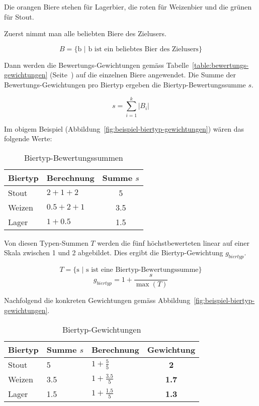 \documentclass[10pt,a4paper]{scrartcl}
\begin{document}
Die orangen Biere stehen für Lagerbier, die roten für Weizenbier und die grünen für Stout.

Zuerst nimmt man alle beliebten Biere des Zielusers.

$$B = \{ \textrm{b $|$ b ist ein beliebtes Bier des Zielusers} \}$$

Dann werden die Bewertungs-Gewichtungen gemäss Tabelle~\ref{table:bewertungs-gewichtungen}
(Seite~\pageref{table:bewertungs-gewichtungen}) auf die einzelnen Biere angewendet. Die Summe der
Bewertungs-Gewichtungen pro Biertyp ergeben die Biertyp-Bewertungssumme $s$.

$$s = \sum_{i=1}^k |B_i|$$

Im obigem Beispiel (Abbildung~\ref{fig:beispiel-biertyp-gewichtungen}) wären das folgende Werte:

\begin{table}[H]
	\begin{center}
		\begin{tabular}{llc}
			\toprule
			Biertyp & Berechnung & Summe $s$ \\
			\midrule
			Stout  & $2 + 1 + 2$   & 5 \\
			Weizen & $0.5 + 2 + 1$ & 3.5 \\
			Lager  & $1 + 0.5$     & 1.5 \\
			\bottomrule
		\end{tabular}
	\end{center}
	\caption{Biertyp-Bewertungssummen}
	\label{table:biertyp-bewertungs-summen}
\end{table}

Von diesen Typen-Summen $T$ werden die fünf höchstbewerteten linear auf einer Skala zwischen 1 und
2 abgebildet. Dies ergibt die Biertyp-Gewichtung $g_{biertyp}$.

$$T = \{ \textrm{s $|$ s ist eine Biertyp-Bewertungssumme} \}$$
$$g_{biertyp} = 1 + \frac{s}{\max(T)}$$

Nachfolgend die konkreten Gewichtungen gemäss Abbildung~\ref{fig:beispiel-biertyp-gewichtungen}.

\begin{table}[H]
	\begin{center}
		\begin{tabular}{lllc}
			\toprule
			Biertyp & Summe $s$ & Berechnung & Gewichtung \\
			\midrule
			Stout  & 5   & $1 + \frac{5}{5}$   & \textbf{2} \\
			Weizen & 3.5 & $1 + \frac{3.5}{5}$ & \textbf{1.7}   \\
			Lager  & 1.5 & $1 + \frac{1.5}{5}$ & \textbf{1.3} \\
			\bottomrule
		\end{tabular}
	\end{center}
	\label{biertyp-gewichtungen}
	\caption{Biertyp-Gewichtungen}
\end{table}
\end{document}
